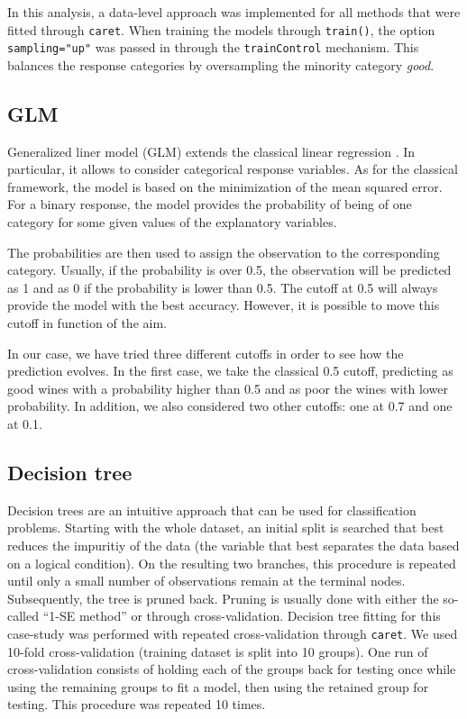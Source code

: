 \documentclass[11pt,]{article}
\begin{document}
In this analysis, a data-level approach was implemented for all methods
that were fitted through \texttt{caret}. When training the models
through \texttt{train()}, the option \texttt{sampling="up"} was passed
in through the \texttt{trainControl} mechanism. This balances the
response categories by oversampling the minority category \emph{good}.

\hypertarget{glm}{%
\subsection{GLM}\label{glm}}

Generalized liner model (GLM) extends the classical linear regression .
In particular, it allows to consider categorical response variables. As
for the classical framework, the model is based on the minimization of
the mean squared error. For a binary response, the model provides the
probability of being of one category for some given values of the
explanatory variables.

The probabilities are then used to assign the observation to the
corresponding category. Usually, if the probability is over 0.5, the
observation will be predicted as 1 and as 0 if the probability is lower
than 0.5. The cutoff at 0.5 will always provide the model with the best
accuracy. However, it is possible to move this cutoff in function of the
aim.

In our case, we have tried three different cutoffs in order to see how
the prediction evolves. In the first case, we take the classical 0.5
cutoff, predicting as good wines with a probability higher than 0.5 and
as poor the wines with lower probability. In addition, we also
considered two other cutoffs: one at 0.7 and one at 0.1.

\hypertarget{decision-tree}{%
\subsection{Decision tree}\label{decision-tree}}

Decision trees are an intuitive approach that can be used for
classification problems. Starting with the whole dataset, an initial
split is searched that best reduces the impuritiy of the data (the
variable that best separates the data based on a logical condition). On
the resulting two branches, this procedure is repeated until only a
small number of observations remain at the terminal nodes. Subsequently,
the tree is pruned back. Pruning is usually done with either the
so-called ``1-SE method'' or through cross-validation. Decision tree
fitting for this case-study was performed with repeated cross-validation
through \texttt{caret}. We used 10-fold cross-validation (training
dataset is split into 10 groups). One run of cross-validation consists
of holding each of the groups back for testing once while using the
remaining groups to fit a model, then using the retained group for
testing. This procedure was repeated 10 times.
\end{document}

